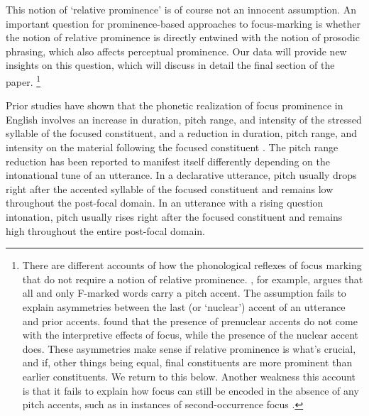 \documentclass[preprint,review,12pt,authoryear,times]{elsarticle}
\begin{document}
This notion of `relative prominence' is of course not an innocent assumption. An important question for prominence-based approaches to focus-marking is whether the notion of relative prominence is directly entwined with the notion of prosodic phrasing, which also affects perceptual prominence. Our data will provide new insights on this question, which will discuss in detail the final section of the paper. %
\footnote{There are different accounts of how the phonological reflexes of focus marking that do not require a notion of relative prominence.  \citet{schwa99}, for example, argues that all and only F-marked words carry a pitch accent. The assumption fails to explain asymmetries between the last (or `nuclear') accent of an utterance and prior accents. \citet{welby03} found that the presence of prenuclear accents do not come with the interpretive effects of focus, while the presence of the nuclear accent does. These asymmetries make sense if relative prominence is what's crucial, and if, other things being equal, final constituents are more prominent than earlier constituents. We return to this below. Another weakness this account is that it fails to explain how focus can still be encoded in the absence of any pitch accents, such as in instances of second-occurrence focus \citep{burin16b,bauma16}.}

Prior studies have shown that the  phonetic realization of focus prominence in English involves an increase in duration, pitch range, and intensity of the stressed syllable of the focused constituent, and a reduction in duration, pitch range, and intensity on the material following the focused constituent \citep[][i.a.]{coope85, eady86, breenetal10}. The pitch range reduction has been reported to manifest itself differently depending on the intonational tune of an utterance. In a declarative utterance, pitch usually drops right after the accented syllable of the focused constituent and remains low throughout the post-focal domain. In an utterance with a rising question intonation, pitch usually rises right after the focused constituent and remains high throughout the entire post-focal domain. 
\end{document}

